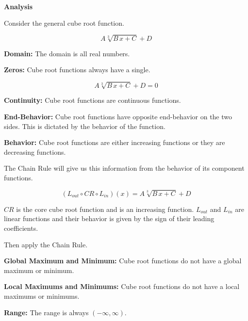 \documentclass{ximera}
\begin{document}
\begin{summary} \textbf{\textcolor{red!70!yellow}{Analysis}}


Consider the general cube root function.

\[  A \sqrt[3]{B \,x + C} + D  \]


\textbf{Domain:} The domain is all real numbers.


\textbf{Zeros:} Cube root functions always have a single.


\[  A \sqrt[3]{B \,x + C} + D  = 0 \]




\textbf{Continuity:} Cube root functions are continuous functions.   



\textbf{End-Behavior:} Cube root functions have opposite end-behavior on the two sides.  This is dictated by the behavior of the function.



\textbf{Behavior:} Cube root functions are either increasing functions or they are decreasing functions.  

The Chain Rule will give us this information from the behavior of its component functions.


\[
(L_{out} \circ CR \circ L_{in})(x) = A \sqrt[3]{B \,x + C} + D
\]


$CR$ is the core cube root function and is an increasing function.  $L_{out}$ and $L_{in}$ are linear functions and their behavior is given by the sign of their leading coefficients.

Then apply the Chain Rule.



\textbf{Global Maximum and Minimum:}  Cube root functions do not have a global maximum or minimum.


\textbf{Local Maximums and Minimums:} Cube root functions do not have a local maximums or minimums.


\textbf{Range:} The range is always $(-\infty, \infty)$.

\end{summary}
\end{document}

